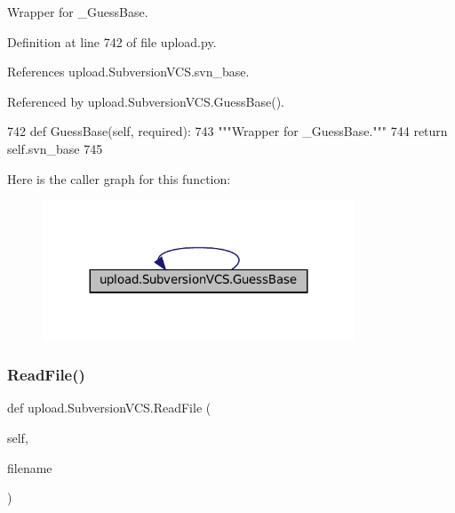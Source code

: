 \begin{DoxyVerb}Wrapper for _GuessBase.\end{DoxyVerb}
 

Definition at line 742 of file upload.\+py.



References upload.\+Subversion\+V\+C\+S.\+svn\+\_\+base.



Referenced by upload.\+Subversion\+V\+C\+S.\+Guess\+Base().


\begin{DoxyCode}
742   \textcolor{keyword}{def }GuessBase(self, required):
743     \textcolor{stringliteral}{"""Wrapper for \_GuessBase."""}
744     \textcolor{keywordflow}{return} self.svn\_base
745 
\end{DoxyCode}
Here is the caller graph for this function\+:
\nopagebreak
\begin{figure}[H]
\begin{center}
\leavevmode
\includegraphics[width=263pt]{classupload_1_1SubversionVCS_a7d22d459469a757270502ce0dccacbd2_icgraph}
\end{center}
\end{figure}
\mbox{\label{classupload_1_1SubversionVCS_a340d269b74386ac863636f6b0683d9f4}} 
\subsubsection{\texorpdfstring{Read\+File()}{ReadFile()}\hspace{0.1cm}{\footnotesize\ttfamily [1/2]}}
{\footnotesize\ttfamily def upload.\+Subversion\+V\+C\+S.\+Read\+File (\begin{DoxyParamCaption}\item[{}]{self,  }\item[{}]{filename }\end{DoxyParamCaption})}

